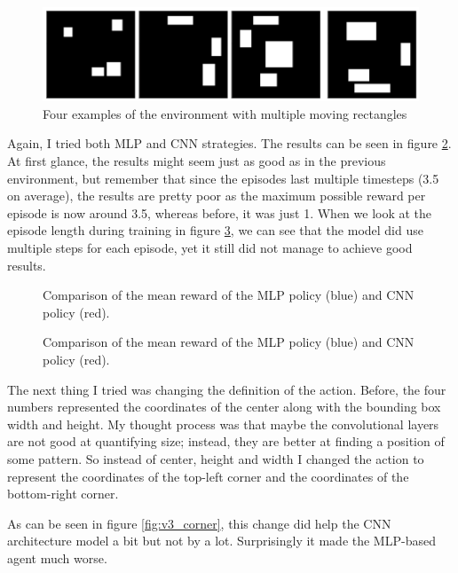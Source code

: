 \documentclass[
  digital,     %
  oneside,     %
  nosansbold,  %
  nocolorbold, %
  lof,         %
  lot,         %
]{fithesis4}
\begin{document}
\begin{figure}
    \includegraphics[width=1\linewidth]{env_examples/env3.png}
    \caption{Four examples of the environment with multiple moving rectangles}
    \label{fig:env3}
\end{figure}

Again, I tried both MLP and CNN strategies. The results can be seen in figure \ref{fig:v3_mlp_cnn}. At first glance, the results might seem just as good as in the previous environment, but remember that since the episodes last multiple timesteps (3.5 on average), the results are pretty poor as the maximum possible reward per episode is now around 3.5, whereas before, it was just 1. When we look at the episode length during training in figure \ref{fig:v3_len}, we can see that the model did use multiple steps for each episode, yet it still did not manage to achieve good results.

\begin{figure}
    \centering
    \makebox[\textwidth][c]{}
    \caption{Comparison of the mean reward of the MLP policy (blue) and CNN policy (red).}
    \label{fig:v3_mlp_cnn}
\end{figure}

\begin{figure}
    \centering
    \makebox[\textwidth][c]{}
    \caption{Comparison of the mean reward of the MLP policy (blue) and CNN policy (red).}
    \label{fig:v3_len}
\end{figure}

The next thing I tried was changing the definition of the action. Before, the four numbers represented the coordinates of the center along with the bounding box width and height. My thought process was that maybe the convolutional layers are not good at quantifying size; instead, they are better at finding a position of some pattern. So instead of center, height and width I changed the action to represent the coordinates of the top-left corner and the coordinates of the bottom-right corner. 

As can be seen in figure \ref{fig:v3_corner}, this change did help the CNN architecture model a bit but not by a lot. Surprisingly it made the MLP-based agent much worse.
\end{document}
